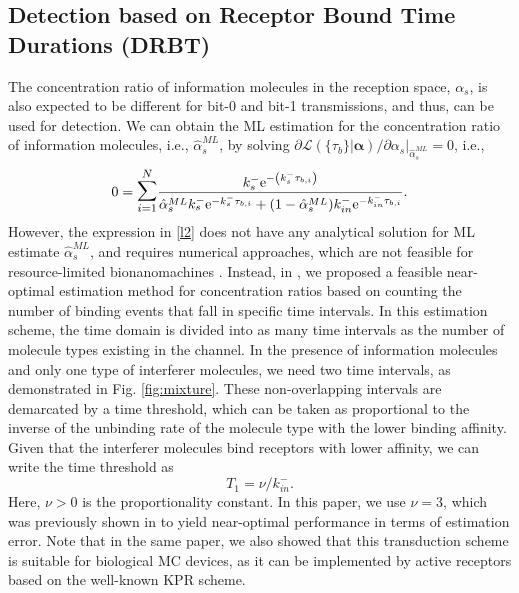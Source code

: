 \documentclass[twocolumn]{IEEEtran}
\newcommand{\e}{\mathrm{e}}
\begin{document}
\subsection{Detection based on Receptor Bound Time Durations  (DRBT)}
The concentration ratio of information molecules in the reception space, $\alpha_s$, is also expected to be different for bit-0 and bit-1 transmissions, and thus, can be used for detection. We can obtain the ML estimation for the concentration ratio of information molecules, i.e., $\hat{\alpha}_s^{ML}$, by solving $\partial \mathcal{L} \left(\{\tau_b \} | \bm{\alpha}\right)  / \partial \alpha_s \Big|_{\hat{\alpha}_s^{ML}} = 0$, i.e., 
\begin{equation}\label{l2}
0 =\mathlarger{\mathlarger{\sum}}_{i=1}^{N} \frac{k_s^- \e^{-\left(k_s^- \tau_{b,i}\right)}} {  \hat{\alpha}_s^{ML} k_s^- \e^{-k_s^- \tau_{b,i}} + (1-\hat{\alpha}_s^{ML}) k_{in}^- \e^{-k_{in}^- \tau_{b,i}}}.
\end{equation}
However, the expression in \eqref{l2} does not have any analytical solution for ML estimate $\hat{\alpha}_s^{ML}$, and requires numerical approaches, which are not feasible for resource-limited bionanomachines \cite{kuscu2019transmitter}. Instead, in \cite{kuscu2019channel}, we proposed a feasible near-optimal estimation method for concentration ratios based on counting the number of binding events that fall in specific time intervals. In this estimation scheme, the time domain is divided into as many time intervals as the number of molecule types existing in the channel. In the presence of information molecules and only one type of interferer molecules, we need two time intervals, as demonstrated in Fig. \ref{fig:mixture}. These non-overlapping intervals are demarcated by a time threshold, which can be taken as proportional to the inverse of the unbinding rate of the molecule type with the lower binding affinity. Given that the interferer molecules bind receptors with lower affinity, we can write the time threshold as 
\begin{equation} \label{timethreshold}
T_1 = \nu/k_{in}^-.
\end{equation}
Here, $\nu > 0$ is the proportionality constant. In this paper, we use  $\nu = 3$, which was previously shown in \cite{kuscu2019channel} to yield near-optimal performance in terms of estimation error. Note that in the same paper, we also showed that this transduction scheme is suitable for biological MC devices, as it can be implemented by active receptors based on the well-known KPR scheme. 
\end{document}
